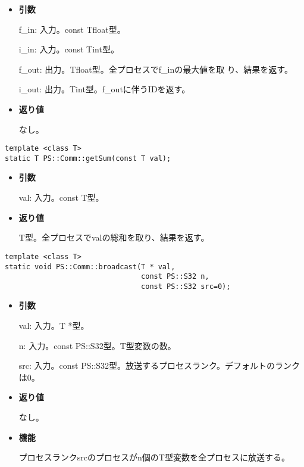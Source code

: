 \begin{itemize}

\item{{\bf 引数}}

f\_in: 入力。const Tfloat型。

i\_in: 入力。{const Tint}型。

{f\_out}: 出力。{Tfloat}型。全プロセスで{f\_in}の最大値を取
り、結果を返す。

{i\_out}: 出力。{Tint}型。{f\_out}に伴うIDを返す。

\item{{\bf 返り値}}

なし。

\end{itemize}


\begin{screen}
\begin{verbatim}
template <class T>
static T PS::Comm::getSum(const T val);
\end{verbatim}
\end{screen}

\begin{itemize}

\item{{\bf 引数}}

{val}: 入力。{const T}型。

\item{{\bf 返り値}}

{T}型。全プロセスで{val}の総和を取り、結果を返す。

\end{itemize}


\begin{screen}
\begin{verbatim}
template <class T>
static void PS::Comm::broadcast(T * val,
                                const PS::S32 n,
                                const PS::S32 src=0);
\end{verbatim}
\end{screen}

\begin{itemize}

\item{{\bf 引数}}

val: 入力。T *型。

n: 入力。const PS::S32型。T型変数の数。

src: 入力。const PS::S32型。放送するプロセスランク。デフォルトのランク
は0。

\item{{\bf 返り値}}

なし。

\item{{\bf 機能}}

プロセスランクsrcのプロセスがn個のT型変数を全プロセスに放送する。

\end{itemize}


